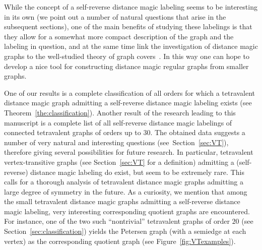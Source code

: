 \documentclass[11 pt,english]{article}
\theoremstyle{definition}
\begin{document}
While the concept of a self-reverse distance magic labeling seems to be interesting in its own (we point out a number of natural questions that arise in the subsequent sections), one of the main benefits of studying these labelings is that they allow for a somewhat more compact description of the graph and the labeling in question, and at the same time link the investigation of distance magic graphs to the well-studied theory of graph covers~\cite{GroTuc77}. In this way one can hope to develop a nice tool for constructing distance magic regular graphs from smaller graphs. 
\medskip

One of our results is a complete classification of all orders for which a tetravalent distance magic graph admitting a self-reverse distance magic labeling exists (see Theorem~\ref{the:classification}). Another result of the research leading to this manuscript is a complete list of all self-reverse distance magic labelings of connected tetravalent graphs of orders up to $30$. The obtained data suggests a number of very natural and interesting questions (see~Section~\ref{sec:VT}), therefore giving several possibilities for future research. In particular, tetravalent vertex-transitive graphs (see Section~\ref{sec:VT} for a definition) admitting a (self-reverse) distance magic labeling do exist, but seem to be extremely rare. This calls for a thorough analysis of tetravalent distance magic graphs admitting a large degree of symmetry in the future. As a curiosity, we mention that among the small tetravalent distance magic graphs admitting a self-reverse distance magic labeling, very interesting corresponding quotient graphs are encountered. For instance, one of the two such ``nontrivial'' tetravalent graphs of order $20$ (see Section~\ref{sec:classification}) yields the Petersen graph (with a semiedge at each vertex) as the corresponding quotient graph (see Figure~\ref{fig:VTexamples}).
\end{document}
